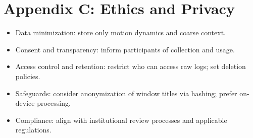 \documentclass[
  12pt,
]{article}
\providecommand{\tightlist}{%
  \setlength{\itemsep}{0pt}\setlength{\parskip}{0pt}}
\begin{document}
\section{Appendix C: Ethics and
Privacy}\label{appendix-c-ethics-and-privacy}

\begin{itemize}
\tightlist
\item
  Data minimization: store only motion dynamics and coarse context.
\item
  Consent and transparency: inform participants of collection and usage.
\item
  Access control and retention: restrict who can access raw logs; set
  deletion policies.
\item
  Safeguards: consider anonymization of window titles via hashing;
  prefer on-device processing.
\item
  Compliance: align with institutional review processes and applicable
  regulations.
\end{itemize}
\end{document}
